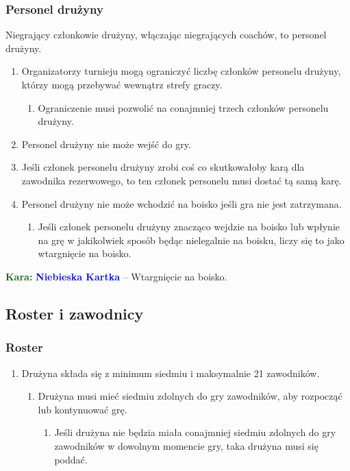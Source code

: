 \documentclass[11pt,a4paper]{article}
\newcommand\bluecard[1]{\bgroup\textcolor{darkgreen}{\textbf{Kara: }}\bgroup\textcolor{blue}{\textbf{Niebieska Kartka}} -- #1}
\begin{document}
\subsubsection{Personel drużyny}
Niegrający członkowie drużyny, włączając niegrających
coachów, to personel drużyny.
\begin{enumerate}
  \item Organizatorzy turnieju mogą ograniczyć liczbę
  członków personelu drużyny, którzy mogą przebywać
  wewnątrz strefy graczy.
  \begin{enumerate}
    \item Ograniczenie musi pozwolić na conajmniej trzech
    członków personelu drużyny.
  \end{enumerate}

  \item Personel drużyny nie może wejść do gry.
  \item Jeśli członek personelu drużyny zrobi coś co
  skutkowałoby karą dla zawodnika rezerwowego, to ten
  członek personelu musi dostać tą samą karę.
  \item Personel drużyny nie może wchodzić na boisko jeśli
  gra nie jest zatrzymana.
  \begin{enumerate}
    \item Jeśli członek personelu drużyny znacząco wejdzie
    na boisko lub wpłynie na grę w jakikolwiek sposób będąc
    nielegalnie na boisku, liczy się to jako wtargnięcie
    na boisko.
  \end{enumerate}
\end{enumerate}

\bluecard{Wtargnięcie na boisko.}

\subsection{Roster i zawodnicy}

\subsubsection{Roster}
\begin{enumerate}
  \item Drużyna składa się z minimum siedmiu i maksymalnie
  21 zawodników.
  \begin{enumerate}
    \item Drużyna musi mieć siedmiu zdolnych do gry zawodników, aby rozpocząć lub kontynuować grę.
    \begin{enumerate}
      \item Jeśli drużyna nie będzia miała conajmniej siedmiu zdolnych do gry zawodników w dowolnym momencie gry, taka drużyna musi się poddać.
    \end{enumerate}
  \end{enumerate}
\end{enumerate}
\end{document}

